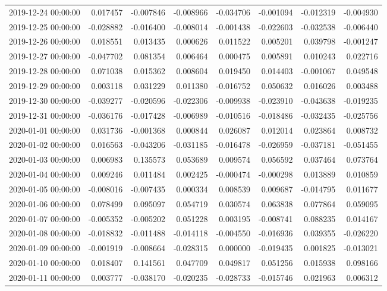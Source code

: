 \begin{tabular}{lrrrrrrr}
2019-12-24 00:00:00 & 0.017457 & -0.007846 & -0.008966 & -0.034706 & -0.001094 & -0.012319 & -0.004930 \\
2019-12-25 00:00:00 & -0.028882 & -0.016400 & -0.008014 & -0.001438 & -0.022603 & -0.032538 & -0.006440 \\
2019-12-26 00:00:00 & 0.018551 & 0.013435 & 0.000626 & 0.011522 & 0.005201 & 0.039798 & -0.001247 \\
2019-12-27 00:00:00 & -0.047702 & 0.081354 & 0.006464 & 0.000475 & 0.005891 & 0.010243 & 0.022716 \\
2019-12-28 00:00:00 & 0.071038 & 0.015362 & 0.008604 & 0.019450 & 0.014403 & -0.001067 & 0.049548 \\
2019-12-29 00:00:00 & 0.003118 & 0.031229 & 0.011380 & -0.016752 & 0.050632 & 0.016026 & 0.003488 \\
2019-12-30 00:00:00 & -0.039277 & -0.020596 & -0.022306 & -0.009938 & -0.023910 & -0.043638 & -0.019235 \\
2019-12-31 00:00:00 & -0.036176 & -0.017428 & -0.006989 & -0.010516 & -0.018486 & -0.032435 & -0.025756 \\
2020-01-01 00:00:00 & 0.031736 & -0.001368 & 0.000844 & 0.026087 & 0.012014 & 0.023864 & 0.008732 \\
2020-01-02 00:00:00 & 0.016563 & -0.043206 & -0.031185 & -0.016478 & -0.026959 & -0.037181 & -0.051455 \\
2020-01-03 00:00:00 & 0.006983 & 0.135573 & 0.053689 & 0.009574 & 0.056592 & 0.037464 & 0.073764 \\
2020-01-04 00:00:00 & 0.009246 & 0.011484 & 0.002425 & -0.000474 & -0.000298 & 0.013889 & 0.010859 \\
2020-01-05 00:00:00 & -0.008016 & -0.007435 & 0.000334 & 0.008539 & 0.009687 & -0.014795 & 0.011677 \\
2020-01-06 00:00:00 & 0.078499 & 0.095097 & 0.054719 & 0.030574 & 0.063838 & 0.077864 & 0.059095 \\
2020-01-07 00:00:00 & -0.005352 & -0.005202 & 0.051228 & 0.003195 & -0.008741 & 0.088235 & 0.014167 \\
2020-01-08 00:00:00 & -0.018832 & -0.011488 & -0.014118 & -0.004550 & -0.016936 & 0.039355 & -0.026220 \\
2020-01-09 00:00:00 & -0.001919 & -0.008664 & -0.028315 & 0.000000 & -0.019435 & 0.001825 & -0.013021 \\
2020-01-10 00:00:00 & 0.018407 & 0.141561 & 0.047709 & 0.049817 & 0.051256 & 0.015938 & 0.098166 \\
2020-01-11 00:00:00 & 0.003777 & -0.038170 & -0.020235 & -0.028733 & -0.015746 & 0.021963 & 0.006312 \\

\end{tabular}
